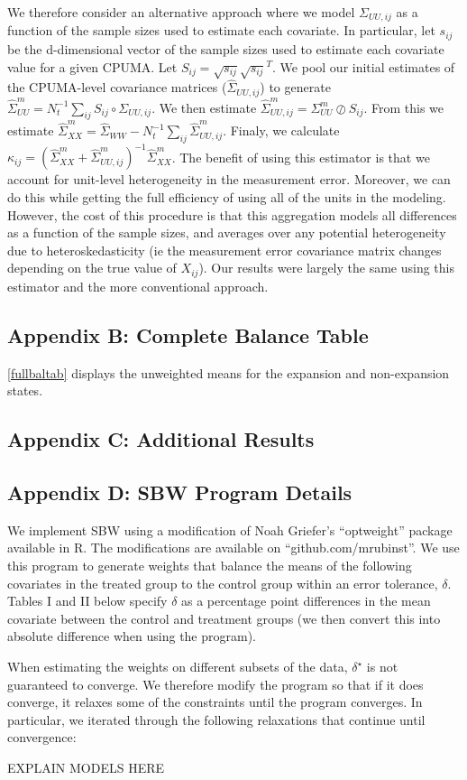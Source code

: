 \documentclass[12pt]{article}
\begin{document}
We therefore consider an alternative approach where we model $\Sigma_{UU, ij}$ as a function of the sample sizes used to estimate each covariate. In particular, let $s_{ij}$ be the d-dimensional vector of the sample sizes used to estimate each covariate value for a given CPUMA. Let $S_{ij} = \sqrt{s_{ij}}\sqrt{s_{ij}}^T$. We pool our initial estimates of the CPUMA-level covariance matrices ($\hat{\Sigma}_{UU, ij}$) to generate $\hat{\Sigma}_{UU}^m = N_t^{-1}\sum_{ij} S_{ij} \circ \Sigma_{UU, ij}$. We then estimate $\hat{\Sigma}_{UU, ij}^m = \Sigma_{UU}^m \oslash S_{ij}$. From this we estimate $\hat{\Sigma}^m_{XX} = \hat{\Sigma}_{WW} - N_t^{-1}\sum_{ij}\hat{\Sigma}^m_{UU, ij}$. Finaly, we calculate $\kappa_{ij} = (\hat{\Sigma}^m_{XX} + \hat{\Sigma}^m_{UU, ij})^{-1}\hat{\Sigma}^m_{XX}$. The benefit of using this estimator is that we account for unit-level heterogeneity in the measurement error. Moreover, we can do this while getting the full efficiency of using all of the units in the modeling. However, the cost of this procedure is that this aggregation models all differences as a function of the sample sizes, and averages over any potential heterogeneity due to heteroskedasticity (ie the measurement error covariance matrix changes depending on the true value of $X_{ij}$). Our results were largely the same using this estimator and the more conventional approach.

\subsection{Appendix B: Complete Balance Table}

\ref{fullbaltab} displays the unweighted means for the expansion and non-expansion states. 


\subsection{Appendix C: Additional Results}

\subsection{Appendix D: SBW Program Details}

We implement SBW using a modification of Noah Griefer's ``optweight'' package available in R. The modifications are available on ``github.com/mrubinst''. We use this program to generate weights that balance the means of the following covariates in the treated group to the control group within an error tolerance, $\delta$. Tables I and II below specify $\delta$ as a percentage point differences in the mean covariate between the control and treatment groups (we then convert this into absolute difference when using the program). 

When estimating the weights on different subsets of the data, $\delta^\star$ is not guaranteed to converge. We therefore modify the program so that if it does converge, it relaxes some of the constraints until the program converges. In particular, we iterated through the  following relaxations that continue until convergence:

EXPLAIN MODELS HERE
\end{document}
